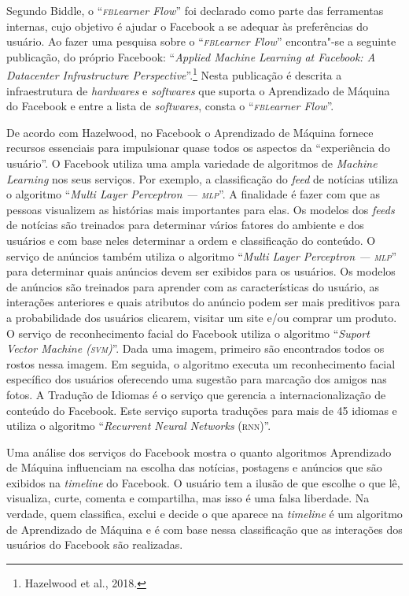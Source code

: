Segundo Biddle, o ``\emph{\textsc{fbl}earner Flow}'' foi declarado como
parte das ferramentas internas, cujo objetivo é ajudar o Facebook a se
adequar às preferências do usuário. Ao fazer uma pesquisa sobre o
``\emph{\textsc{fbl}earner Flow}'' encontra"-se a seguinte publicação, do próprio
Facebook: ``\emph{Applied Machine Learning at Facebook: A Datacenter
Infrastructure Perspective}''.\footnote{Hazelwood et al., 2018.} Nesta
publicação é descrita a infraestrutura de \emph{hardwares} e \emph{softwares} que
suporta o Aprendizado de Máquina do Facebook e entre a lista de
\emph{softwares}, consta o ``\emph{\textsc{fbl}earner Flow}''.

De acordo com Hazelwood, no Facebook o Aprendizado de
Máquina fornece recursos essenciais para impulsionar quase todos os
aspectos da ``experiência do usuário''. O Facebook utiliza uma ampla
variedade de algoritmos de \emph{Machine Learning} nos seus serviços.
Por exemplo, a classificação do \emph{feed} de notícias utiliza o
algoritmo ``\emph{Multi Layer Perceptron --- \textsc{mlp}}''. A finalidade é fazer
com que as pessoas visualizem as histórias mais importantes para elas.
Os modelos dos \emph{feeds} de notícias são treinados para determinar
vários fatores do ambiente e dos usuários e com base neles determinar a
ordem e classificação do conteúdo. O serviço de anúncios também utiliza
o algoritmo ``\emph{Multi Layer Perceptron  --- \textsc{mlp}}'' para determinar
quais anúncios devem ser exibidos para os usuários. Os modelos de
anúncios são treinados para aprender com as características do usuário,
as interações anteriores e quais atributos do anúncio podem ser mais
preditivos para a probabilidade dos usuários clicarem, visitar um site
e/ou comprar um produto. O serviço de reconhecimento facial do Facebook
utiliza o algoritmo ``\emph{Suport Vector Machine (\textsc{svm})}''. Dada uma
imagem, primeiro são encontrados todos os rostos nessa imagem. Em
seguida, o algoritmo executa um reconhecimento facial específico dos
usuários oferecendo uma sugestão para marcação dos amigos nas fotos. A
Tradução de Idiomas é o serviço que gerencia a internacionalização de
conteúdo do Facebook. Este serviço suporta traduções para mais de 45
idiomas e utiliza o algoritmo ``\emph{Recurrent Neural Networks}
(\textsc{rnn})''.

Uma análise dos serviços do Facebook mostra o quanto algoritmos
Aprendizado de Máquina influenciam na escolha das notícias, postagens e
anúncios que são exibidos na \emph{timeline} do Facebook. O usuário tem
a ilusão de que escolhe o que lê, visualiza, curte, comenta e
compartilha, mas isso é uma falsa liberdade. Na verdade, quem
classifica, exclui e decide o que aparece na \emph{timeline} é um
algoritmo de Aprendizado de Máquina e é com base nessa classificação que
as interações dos usuários do Facebook são realizadas.

